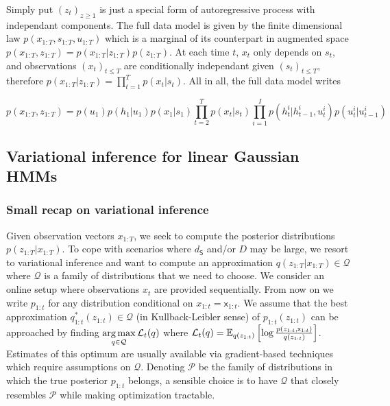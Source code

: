 \documentclass{article}
\begin{document}
Simply put $(z_t)_{z \geq 1}$ is just a special form of autoregressive process with independant components. The full data model is given by the finite dimensional law $p(x_{1:T}, s_{1:T}, u_{1:T})$ which is a marginal of its counterpart in augmented space $p(x_{1:T}, z_{1:T}) = p(x_{1:T} \vert z_{1:T})p(z_{1:T})$. At each time $t$, $x_t$ only depends on $s_t$, and observations $(x_t)_{t \leq T}$ are conditionally independant given $(s_t)_{t \leq T}$, therefore $p(x_{1:T} \vert z_{1:T}) = \prod_{t=1}^T p(x_t|s_t)$. All in all, the full data model writes


\begin{equation}\label{full_model}
    p(x_{1:T}, z_{1:T}) = p(u_1)p(h_1|u_1) p(x_1|s_1) \prod_{t=2}^T p(x_t|s_t) \prod_{i=1}^I p(h_t^i|h_{t-1}^i,u_t^i)p(u_t^i|u_{t-1}^i)
\end{equation} 

\subsection{Variational inference for linear Gaussian HMMs}\label{linear_gauss}
\subsubsection*{Small recap on variational inference}
Given observation vectors $x_{1:T}$, we seek to compute the posterior distributions $p( z_{1:T}|x_{1:T})$. To cope with scenarios where $d_{\mathsf{S}}$ and/or $D$ may be large, we resort to variational inference and want to compute an approximation $q( z_{1:T}|x_{1:T}) \in \mathcal{Q}$ where $\mathcal{Q}$ is a family of distributions that we need to choose. 
We consider an online setup where observations $x_t$ are provided sequentially. From now on we write $p_{1:t}$ for any distribution conditional on $x_{1:t} = \mathsf{x}_{1:t}$. We assume that the best approximation $q_{1:t}^*(z_{1:t}) \in \mathcal{Q}$ (in Kullback-Leibler sense) of $p_{1:t}( z_{1:t})$ can be approached by finding $\operatorname*{arg\,max}\limits_{q \in \mathcal{Q}} \mathcal{L}_t(q)$ where $\mathcal{L}_t(q) = \mathbb{E}_{q(z_{1:t})}\left[\log\frac{p(z_{1:t}, \mathsf{x}_{1:t})}{q(z_{1:t})}\right]$. 
Estimates of this optimum are usually available via gradient-based techniques which require assumptions on $\mathcal{Q}$. 
Denoting $\mathcal{P}$ be the family of distributions in which the true posterior $p_{1:t}$ belongs, a sensible choice is to have $\mathcal{Q}$ that closely resembles $\mathcal{P}$ while making optimization tractable. 
\end{document}
